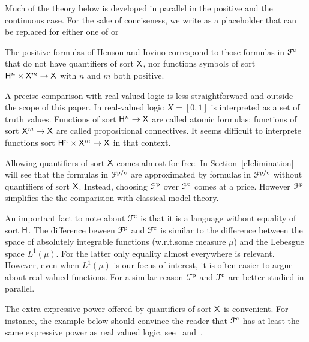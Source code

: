 \documentclass{amsproc}
\renewcommand*{\emph}[1]{%
   \smash{\tikz[baseline]\node[rectangle, fill=teal!25, rounded corners, inner xsep=0.5ex, inner ysep=0.2ex, anchor=base, minimum height = 2.7ex]{\strut #1};}}
\begin{document}

\begin{notation}
  Much of the theory below is developed in parallel in the positive and the continuous case.
  For the sake of conciseness, we write \emph{p/c} as a placeholder that can be replaced for either one of \emph{p} or \emph{c.}
\end{notation}

The positive formulas of Henson and Iovino correspond to those formulas in ${\EuScript F}^{\rm c}$ that do not have quantifiers of sort ${\sf X}$, nor functions symbols of sort ${\sf H}^n\times{\sf X}^m\to {\sf X}$ with $n$ and $m$ both positive.

A precise comparison with real-valued logic is less straightforward and outside the scope of this paper.
In real-valued logic $X=[0,1]$ is interpreted as a set of truth values.
Functions of sort ${\sf H}^n\to {\sf X}$ are called atomic formulas; functions of sort ${\sf X}^m\to {\sf X}$ are called propositional connectives.
It seems difficult to interprete functions sort ${\sf H}^n\times{\sf X}^m\to {\sf X}$ in that context.

Allowing quantifiers of sort ${\sf X}$ comes almost for free.
In Section~\ref{cIelimination} will see that the formulas in ${\EuScript F}^{\rm p/c}$ are approximated by formulas in ${\EuScript F}^{\rm p/c}$ without quantifiers of sort ${\sf X}$.
Instead, choosing ${\EuScript F}^{\rm p}$ over ${\EuScript F}^{\rm c}$ comes at a price.
However ${\EuScript F}^{\rm p}$ simplifies the the comparision with classical model theory.

An important fact to note about ${\EuScript F}^{\rm c}$ is that it is a language without equality of sort ${\sf H}$.
The difference beween ${\EuScript F}^{\rm p}$ and ${\EuScript F}^{\rm c}$ is similar to the difference between the space of absolutely integrable functions (w.r.t.\@ some measure $\mu$) and the Lebesgue space $L^1(\mu)$.
For the latter only equality almost everywhere is relevant.
However, even when $L^1(\mu)$ is our focus of interest, it is often easier to argue about real valued functions.
For a similar reason ${\EuScript F}^{\rm p}$ and ${\EuScript F}^{\rm c}$ are better studied in parallel.

The extra expressive power offered by quantifiers of sort ${\sf X}$ is convenient.
For instance, the example below should convince the reader that ${\EuScript F}^{\rm c}$ has at least the same expressive power as real valued logic, see~\cite{BBHU} and~\cite{K}.%
\end{document}
